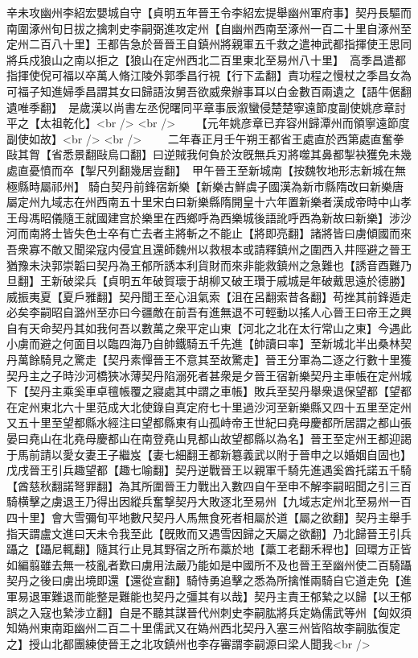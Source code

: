 辛未攻幽州李紹宏嬰城自守【貞明五年晉王令李紹宏提舉幽州軍府事】契丹長驅而南圍涿州旬日拔之擒刺史李嗣弼進攻定州【自幽州西南至涿州一百二十里自涿州至定州二百八十里】王都告急於晉晉王自鎮州將親軍五千救之遣神武都指揮使王思同將兵戍狼山之南以拒之【狼山在定州西北二百里東北至易州八十里】　高季昌遣都指揮使倪可福以卒萬人脩江陵外郭季昌行視【行下孟翻】責功程之慢杖之季昌女為可福子知進婦季昌謂其女曰歸語汝舅吾欲威衆辦事耳以白金數百兩遺之【語牛倨翻遺唯季翻】　是歲漢以尚書左丞倪曙同平章事辰溆蠻侵楚楚寧遠節度副使姚彦章討平之【太祖乾化】<br />
<br />
　　【元年姚彦章已弃容州歸潭州而領寧遠節度副使如故】<br />
<br />
　　二年春正月壬午朔王都省王處直於西第處直奮拳敺其胷【省悉景翻敺烏口翻】曰逆賊我何負於汝旣無兵刃將噬其鼻都掣袂獲免未幾處直憂憤而卒【掣尺列翻幾居豈翻】　甲午晉王至新城南【按魏牧地形志新城在無極縣時屬祁州】騎白契丹前鋒宿新樂【新樂古鮮虞子國漢為新市縣隋改曰新樂唐屬定州九域志在州西南五十里宋白曰新樂縣隋開皇十六年置新樂者漢成帝時中山孝王母馮昭儀隨王就國建宫於樂里在西鄉呼為西樂城後語訛呼西為新故曰新樂】涉沙河而南將士皆失色士卒有亡去者主將斬之不能止【將即亮翻】諸將皆曰虜傾國而來吾衆寡不敵又聞梁寇内侵宜且還師魏州以救根本或請釋鎮州之圍西入井陘避之晉王猶豫未決郭崇韜曰契丹為王郁所誘本利貨財而來非能救鎮州之急難也【誘音酉難乃旦翻】王新破梁兵【貞明五年破賀瓌于胡柳又破王瓚于戚城是年破戴思遠於德勝】威振夷夏【夏戶雅翻】契丹聞王至心沮氣索【沮在呂翻索昔各翻】苟挫其前鋒遁走必矣李嗣昭自潞州至亦曰今疆敵在前吾有進無退不可輕動以搖人心晉王曰帝王之興自有天命契丹其如我何吾以數萬之衆平定山東【河北之北在太行常山之東】今遇此小虜而避之何面目以臨四海乃自帥鐵騎五千先進【帥讀曰率】至新城北半出桑林契丹萬餘騎見之驚走【契丹素憚晉王不意其至故驚走】晉王分軍為二逐之行數十里獲契丹主之子時沙河橋狹冰薄契丹陷溺死者甚衆是夕晉王宿新樂契丹主車帳在定州城下【契丹主乘奚車卓氊帳覆之寢處其中謂之車帳】敗兵至契丹舉衆退保望都【望都在定州東北六十里范成大北使錄自真定府七十里過沙河至新樂縣又四十五里至定州又五十里至望都縣水經注曰望都縣東有山孤峙帝王世紀曰堯母慶都所居謂之都山張晏曰堯山在北堯母慶都山在南登堯山見都山故望都縣以為名】晉王至定州王都迎謁于馬前請以愛女妻王子繼岌【妻七細翻王都新簒義武以附于晉申之以婚姻自固也】戊戌晉王引兵趣望都【趣七喻翻】契丹逆戰晉王以親軍千騎先進遇奚酋托諾五千騎【酋慈秋翻諾弩罪翻】為其所圍晉王力戰出入數四自午至申不解李嗣昭聞之引三百騎横擊之虜退王乃得出因縱兵奮撃契丹大敗逐北至易州【九域志定州北至易州一百四十里】會大雪彌旬平地數尺契丹人馬無食死者相屬於道【屬之欲翻】契丹主舉手指天謂盧文進曰天未令我至此【旣敗而又遇雪因歸之天屬之欲翻】乃北歸晉王引兵躡之【躡尼輒翻】隨其行止見其野宿之所布藁於地【藁工老翻禾稈也】回環方正皆如編翦雖去無一枝亂者歎曰虜用法嚴乃能如是中國所不及也晉王至幽州使二百騎躡契丹之後曰虜出境即還【還從宣翻】騎恃勇追擊之悉為所擒惟兩騎自它道走免【進軍易退軍難退而能整是難能也契丹之彊其有以哉】契丹主責王郁縶之以歸【以王郁誤之入寇也縶涉立翻】自是不聽其謀晉代州刺史李嗣肱將兵定媯儒武等州【匈奴須知媯州東南距幽州二百二十里儒武又在媯州西北契丹入塞三州皆陷故李嗣肱復定之】授山北都團練使晉王之北攻鎮州也李存審謂李嗣源曰梁人聞我<br />
